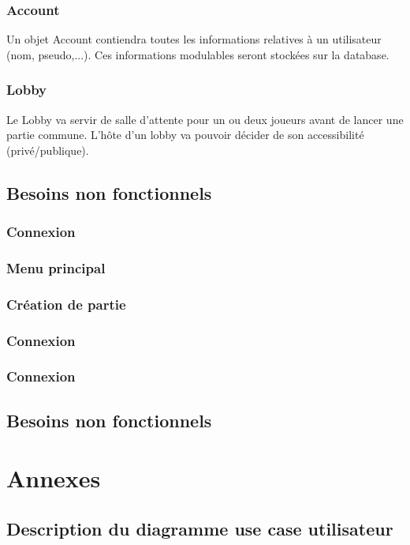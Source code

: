\documentclass[utf8]{article}
\begin{document}
\subsubsection{Account}
Un objet Account contiendra toutes les informations relatives à un utilisateur (nom, pseudo,...). Ces informations modulables seront stockées sur la database.
\subsubsection{Lobby}
Le Lobby va servir de salle d'attente pour un ou deux joueurs avant de lancer une partie commune. L'hôte d'un lobby va pouvoir décider de son accessibilité (privé/publique).

\subsection{Besoins non fonctionnels}
\subsubsection{Connexion}
\subsubsection{Menu principal}
\subsubsection{Création de partie}
\subsubsection{Connexion}
\subsubsection{Connexion}
\subsection{Besoins non fonctionnels}

\newpage
\section{Annexes}
\subsection{ Description du diagramme use case utilisateur}
\end{document}
